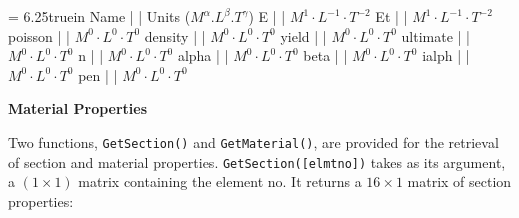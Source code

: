 \begin{table}[ht]
\tablewidth = 6.25truein
\begintable
Name          |                          | Units ($M^{\alpha}.L^{\beta}.T^{\gamma}$) \crthick
E                 |   | $M^1 \cdot L^{-1} \cdot T^{-2}$ \cr
Et                |   | $M^1 \cdot L^{-1} \cdot T^{-2}$ \cr
poisson           |                | $M^0 \cdot L^{0} \cdot T^{0}$ \cr
density           |               | $M^0 \cdot L^{0} \cdot T^{0}$ \cr
yield             |             | $M^0 \cdot L^{0} \cdot T^{0}$ \cr
ultimate          |          | $M^0 \cdot L^{0} \cdot T^{0}$ \cr
n                 |       | $M^0 \cdot L^{0} \cdot T^{0}$ \cr
alpha             |     | $M^0 \cdot L^{0} \cdot T^{0}$ \cr
beta              |             | $M^0 \cdot L^{0} \cdot T^{0}$ \cr
ialph             |   | $M^0 \cdot L^{0} \cdot T^{0}$ \cr
pen               |                             | $M^0 \cdot L^{0} \cdot T^{0}$
\endtable
\vspace{0.01 in}
\caption{\bf Material Properties}
\label{tab: my-material-properties}
\end{table}

\vspace{0.15 in}\noindent
Two functions, {\tt GetSection()} and {\tt GetMaterial()},
are provided for the retrieval of section and material properties.
{\tt GetSection([elmtno])} takes as its argument, a $(1 \times 1)$
matrix containing the element no. It returns a
{\tt $16 \times 1$} matrix of section properties:

